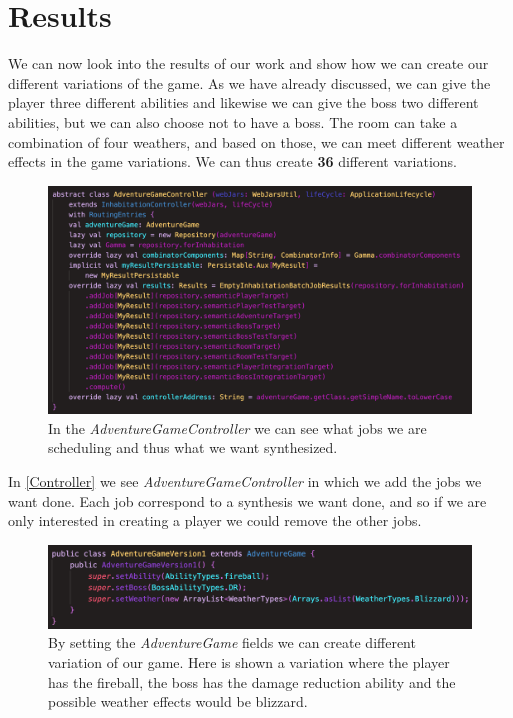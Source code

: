 \section{Results}
We can now look into the results of our work and show how we can create our different variations of the game. As we have already discussed, we can give the player three different abilities and likewise we can give the boss two different abilities, but we can also choose not to have a boss. The room can take a combination of four weathers, and based on those, we can meet different weather effects in the game variations. We can thus create \textbf{36} different variations.

\begin{figure}[H]
	\centering
	\includegraphics[width=\linewidth]{Materials/Results/AdventureController}
	\caption{In the \textit{AdventureGameController} we can see what jobs we are scheduling and thus what we want synthesized.}
	\label{Controller}
\end{figure}
In \autoref{Controller} we see \textit{AdventureGameController} in which we add the jobs we want done. Each job correspond to a synthesis we want done, and so if we are only interested in creating a player we could remove the other jobs.

\begin{figure}[H]
	\centering
	\includegraphics[width=\linewidth]{Materials/Results/AdventureVariation}
	\caption{By setting the \textit{AdventureGame} fields we can create different variation of our game. Here is shown a variation where the player has the fireball, the boss has the damage reduction ability and the possible weather effects would be blizzard.}
	\label{version1}
\end{figure}

